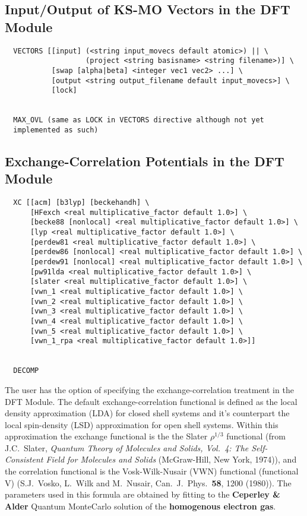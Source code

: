 \subsection{Input/Output of KS-MO Vectors in the DFT Module}
\begin{verbatim}
  VECTORS [[input] (<string input_movecs default atomic>) || \
                   (project <string basisname> <string filename>)] \
           [swap [alpha|beta] <integer vec1 vec2> ...] \
           [output <string output_filename default input_movecs>] \
           [lock]


  MAX_OVL (same as LOCK in VECTORS directive although not yet
  implemented as such)
\end{verbatim}

\subsection{Exchange-Correlation Potentials in the DFT Module}
\begin{verbatim}
  XC [[acm] [b3lyp] [beckehandh] \
      [HFexch <real multiplicative_factor default 1.0>] \
      [becke88 [nonlocal] <real multiplicative_factor default 1.0>] \
      [lyp <real multiplicative_factor default 1.0>] \
      [perdew81 <real multiplicative_factor default 1.0>] \
      [perdew86 [nonlocal] <real multiplicative_factor default 1.0>] \
      [perdew91 [nonlocal] <real multiplicative_factor default 1.0>] \
      [pw91lda <real multiplicative_factor default 1.0>] \
      [slater <real multiplicative_factor default 1.0>] \
      [vwn_1 <real multiplicative_factor default 1.0>] \
      [vwn_2 <real multiplicative_factor default 1.0>] \
      [vwn_3 <real multiplicative_factor default 1.0>] \
      [vwn_4 <real multiplicative_factor default 1.0>] \
      [vwn_5 <real multiplicative_factor default 1.0>] \
      [vwn_1_rpa <real multiplicative_factor default 1.0>]]


  DECOMP
\end{verbatim}

The user has the option of specifying the exchange-correlation treatment 
in the DFT Module.  The default exchange-correlation functional is defined
as the local density approximation (LDA) for closed shell systems and it's
counterpart the local spin-density (LSD) approximation for open shell
systems.  Within this approximation the exchange functional is the 
the Slater $\rho^{1/3}$ functional (from J.C.~Slater, 
{\sl Quantum Theory of Molecules and
Solids, Vol.~4: The Self-Consistent Field for Molecules and Solids}
(McGraw-Hill, New York, 1974)), and the correlation
functional is the Vosk-Wilk-Nusair (VWN) functional (functional V)
(S.J.~Vosko, L.~Wilk and M.~Nusair, 
Can.~J.~Phys.~{\bf  58}, 1200 (1980)).  The parameters used in this
formula are obtained by fitting to the {\bf Ceperley \&
Alder\footnotemark[1]} Quantum
MonteCarlo solution of the {\bf homogenous electron gas}.

